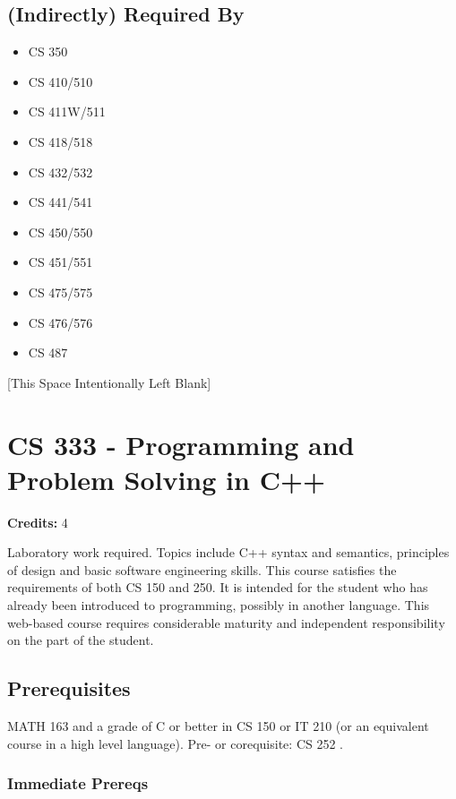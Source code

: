 \documentclass[]{article}
\providecommand{\tightlist}{%
  \setlength{\itemsep}{0pt}\setlength{\parskip}{0pt}}
\newcommand{\pagebreakhere}{
\vspace*{\fill}
\begin{center}
[This Space Intentionally Left Blank]
\end{center}
\vspace*{\fill}
\newpage
}
\begin{document}
\subsection{(Indirectly) Required By}\label{indirectly-required-by-7}

\begin{multicols}{2}
\begin{itemize}
\tightlist
\item
  CS 350
\item
  CS 410/510
\item
  CS 411W/511
\item
  CS 418/518
\item
  CS 432/532
\item
  CS 441/541
\item
  CS 450/550
\item
  CS 451/551
\item
  CS 475/575
\item
  CS 476/576
\item
  CS 487
\end{itemize}
\end{multicols}

\pagebreakhere
\section{CS 333 - Programming and Problem Solving in
C++}\label{cs-333---programming-and-problem-solving-in-c}

\textbf{Credits:} 4

Laboratory work required. Topics include C++ syntax and semantics,
principles of design and basic software engineering skills. This course
satisfies the requirements of both CS 150 and 250. It is intended for
the student who has already been introduced to programming, possibly in
another language. This web-based course requires considerable maturity
and independent responsibility on the part of the student.

\subsection{Prerequisites}\label{prerequisites-15}

MATH 163 and a grade of C or better in CS 150 or IT 210 (or an
equivalent course in a high level language). Pre- or corequisite: CS 252
.

\subsubsection{Immediate Prereqs}\label{immediate-prereqs-10}
\end{document}
